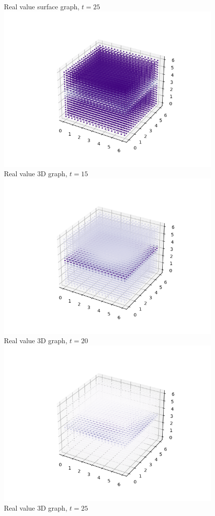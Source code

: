 \documentclass[a4paper,8pt]{article}
\begin{document}
\begin{figure}[h!]
\begin{multicols}{2}
Real value surface graph, $t=25$
\includegraphics[width=1\linewidth]{t15real3d}\\
Real value 3D graph, $t=15$
\includegraphics[width=1\linewidth]{t20real3d}\\
Real value 3D graph, $t=20$
\includegraphics[width=1\linewidth]{t25real3d}\\
Real value 3D graph, $t=25$
\end{multicols}
\end{figure}
\end{document}
